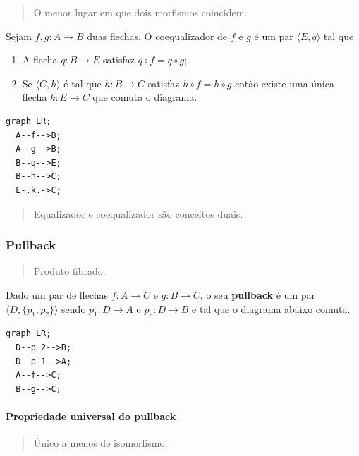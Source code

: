 \begin{quote}
O menor lugar em que dois morfismos coincidem.
\end{quote}

Sejam \(f,g : A \rightarrow B\) duas flechas. O coequalizador de \(f\) e
\(g\) é um par \(\langle E, q \rangle\) tal que

\begin{enumerate}
\def\labelenumi{\arabic{enumi}.}
\tightlist
\item
  A flecha \(q : B \rightarrow E\) satisfaz \(q \circ f = q \circ g\);
\item
  Se \(\langle C, h \rangle\) é tal que \(h : B \rightarrow C\) satisfaz
  \(h \circ f = h \circ g\) então existe uma única flecha
  \(k : E \rightarrow C\) que comuta o diagrama.
\end{enumerate}

\begin{verbatim}
graph LR;
  A--f-->B;
  A--g-->B;
  B--q-->E;
  B--h-->C;
  E-.k.->C;
\end{verbatim}

\begin{quote}
Equalizador e coequalizador são conceitos duais.
\end{quote}

\hypertarget{pullback}{%
\subsubsection{Pullback}\label{pullback}}

\begin{quote}
Produto fibrado.
\end{quote}

Dado um par de flechas \(f : A \rightarrow C\) e
\(g : B \rightarrow C\), o seu \textbf{pullback} é um par
\(\langle D, \{p_1, p_2\}\rangle\) sendo \(p_1 : D \rightarrow A\) e
\(p_2 : D \rightarrow B\) e tal que o diagrama abaixo comuta.

\begin{verbatim}
graph LR;
  D--p_2-->B;
  D--p_1-->A;
  A--f-->C;
  B--g-->C;
\end{verbatim}

\hypertarget{propriedade-universal-do-pullback}{%
\paragraph{Propriedade universal do
pullback}\label{propriedade-universal-do-pullback}}

\begin{quote}
Único a menos de isomorfismo.
\end{quote}

